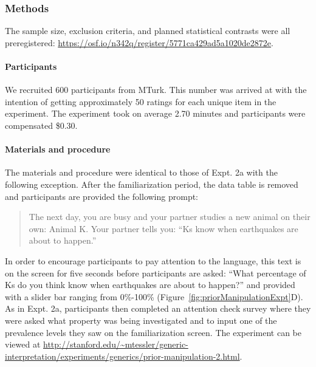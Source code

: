 \documentclass[floatsintext,doc]{apa6}
\let\oldparagraph\paragraph
\renewcommand{\paragraph}[1]{\oldparagraph{#1}\mbox{}}
\begin{document}
\hypertarget{methods-3}{%
\subsubsection{Methods}\label{methods-3}}

The sample size, exclusion criteria, and planned statistical contrasts were all preregistered: \url{https://osf.io/n342q/register/5771ca429ad5a1020de2872e}.

\hypertarget{participants-4}{%
\paragraph{Participants}\label{participants-4}}

We recruited 600 participants from MTurk.
This number was arrived at with the intention of getting approximately 50 ratings for each unique item in the experiment.
The experiment took on average 2.70 minutes and participants were compensated \$0.30.

\hypertarget{materials-and-procedure}{%
\paragraph{Materials and procedure}\label{materials-and-procedure}}

The materials and procedure were identical to those of Expt. 2a with the following exception.
After the familiarization period, the data table is removed and participants are provided the following prompt:

\begin{quote}
The next day, you are busy and your partner studies a new animal on their own: Animal K.
Your partner tells you: \enquote{Ks know when earthquakes are about to happen.}
\end{quote}

In order to encourage participants to pay attention to the language, this text is on the screen for five seconds before participants are asked: \enquote{What percentage of Ks do you think know when earthquakes are about to happen?} and provided with a slider bar ranging from 0\%-100\% (Figure~\ref{fig:priorManipulationExpt}D).
As in Expt. 2a, participants then completed an attention check survey where they were asked what property was being investigated and to input one of the prevalence levels they saw on the familiarization screen.
The experiment can be viewed at \url{http://stanford.edu/~mtessler/generic-interpretation/experiments/generics/prior-manipulation-2.html}.
\end{document}
